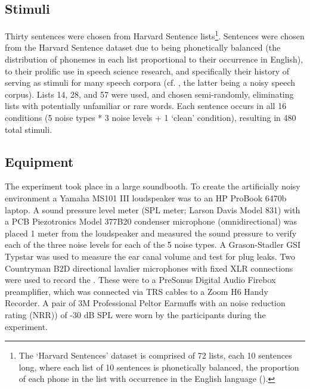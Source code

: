 \subsection{Stimuli}
Thirty sentences were chosen from \DIFdelbegin {}\DIFdelend \DIFaddbegin {}\DIFaddend Harvard Sentence lists\footnote{The `Harvard Sentences' dataset is comprised of 72 lists, each 10 sentences long, where each list of 10 sentences is phonetically balanced, \DIFdelbegin {}\DIFdelend \DIFaddbegin {}\DIFaddend the proportion of each phone in the list \DIFdelbegin {}\DIFdelend \DIFaddbegin {}\DIFaddend with \DIFdelbegin {}\DIFdelend \DIFaddbegin {}\DIFaddend occurrence in the English language (\cite{harvardSents}).}.  Sentences were chosen from the Harvard Sentence dataset due to being phonetically balanced (the distribution of phonemes in each list proportional to their occurrence in English), \DIFaddbegin {}\DIFaddend to their prolific use in speech science research, and specifically their history of serving as stimuli for many speech corpora (cf. \cite{kabal:02,hu:07}, the latter being a noisy speech corpus).  Lists 14, 28, and 57 were used, and chosen semi-randomly, eliminating lists with potentially unfamiliar or rare words.  Each sentence occurs in all 16 conditions (5 noise types * 3 noise levels + 1 `clean' condition), resulting in 480 total stimuli.

  
\subsection{Equipment}

The experiment took place in a large soundbooth.  To create the artificially noisy environment a Yamaha MS101 III loudspeaker was \DIFdelbegin {}\DIFdelend \DIFaddbegin {}\DIFaddend to an HP ProBook 6470b laptop.  A sound pressure level meter (SPL meter; Larson Davis Model 831) with a PCB Piezotronics Model 377B20 condenser microphone (omnidirectional) was placed 1 meter from the loudspeaker and measured the sound pressure to verify each of the three noise levels for each of the 5 noise types. A Grason-Stadler GSI Typstar \DIFdelbegin {}\DIFdelend \DIFaddbegin {}\DIFaddend was used to measure the ear canal volume and test for plug leaks.  Two Countryman B2D directional lavalier microphones with fixed XLR connections were used to record the \DIFdelbegin {}\DIFdelend \DIFaddbegin {}\DIFaddend .  These were \DIFdelbegin {}\DIFdelend \DIFaddbegin {}\DIFaddend to a PreSonus Digital Audio Firebox preamplifier, which was connected via TRS cables to a Zoom H6 Handy Recorder. A pair of 3M Professional Peltor Earmuffs with an noise reduction rating (NRR)) of -30 dB SPL were worn by the participants during the experiment.


